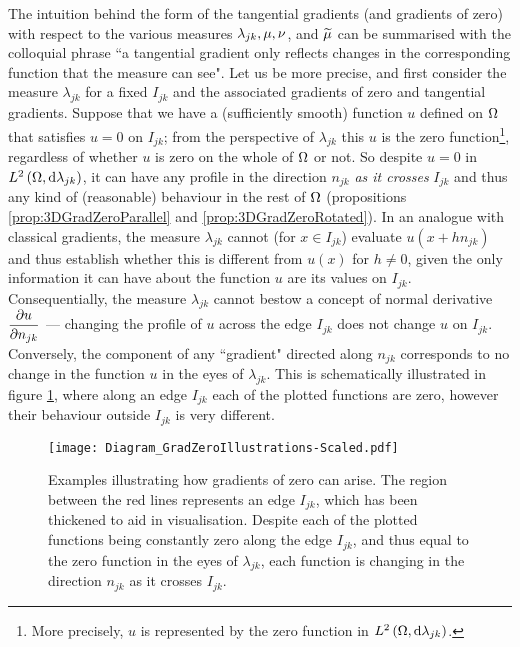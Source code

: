 The intuition behind the form of the tangential gradients (and gradients of zero) with respect to the various measures $\lambda_{jk}, \mu, \nu$, and $\widetilde{\mu}$ can be summarised with the colloquial phrase ``a tangential gradient only reflects changes in the corresponding function that the measure can see".
Let us be more precise, and first consider the measure $\lambda_{jk}$ for a fixed $I_{jk}$ and the associated gradients of zero and tangential gradients.
Suppose that we have a (sufficiently smooth) function $u$ defined on $\Omega$ that satisfies $u=0$ on $I_{jk}$; from the perspective of $\lambda_{jk}$ this $u$ is the zero function\footnote{More precisely, $u$ is represented by the zero function in $L^{2}\left( \Omega,\mathrm{d} \lambda_{jk} \right)$.}, regardless of whether $u$ is zero on the whole of $\Omega$ or not.
So despite $u=0$ in $L^{2}\left( \Omega,\mathrm{d} \lambda_{jk} \right)$, it can have any profile in the direction $n_{jk}$ \emph{as it crosses} $I_{jk}$ and thus any kind of (reasonable) behaviour in the rest of $\Omega$ (propositions \ref{prop:3DGradZeroParallel} and \ref{prop:3DGradZeroRotated}).
In an analogue with classical gradients, the measure $\lambda_{jk}$ cannot (for $x\in I_{jk}$) evaluate $u(x+hn_{jk})$ and thus establish whether this is different from $u(x)$ for $h\neq0$, given the only information it can have about the function $u$ are its values on $I_{jk}$.
Consequentially, the measure $\lambda_{jk}$ cannot bestow a concept of normal derivative $\dfrac{\partial u}{\partial n_{jk}}$ --- changing the profile of $u$ across the edge $I_{jk}$ does not change $u$ on $I_{jk}$.
Conversely, the component of any ``gradient" directed along $n_{jk}$ corresponds to no change in the function $u$ in the eyes of $\lambda_{jk}$.
This is schematically illustrated in figure \ref{fig:Diagram_GradZeroIllustrations}, where along an edge $I_{jk}$ each of the plotted functions are zero, however their behaviour outside $I_{jk}$ is very different.
\begin{figure}[b!]
	\centering
	\texttt{[image: Diagram\_GradZeroIllustrations-Scaled.pdf]}
	\caption[Illustration of how gradients of zero can arise from functions that are not almost-everywhere zero.]{\label{fig:Diagram_GradZeroIllustrations} Examples illustrating how gradients of zero can arise. The region between the red lines represents an edge $I_{jk}$, which has been thickened to aid in visualisation. Despite each of the plotted functions being constantly zero along the edge $I_{jk}$, and thus equal to the zero function in the eyes of $\lambda_{jk}$, each function is changing in the direction $n_{jk}$ as it crosses $I_{jk}$.}
\end{figure}
